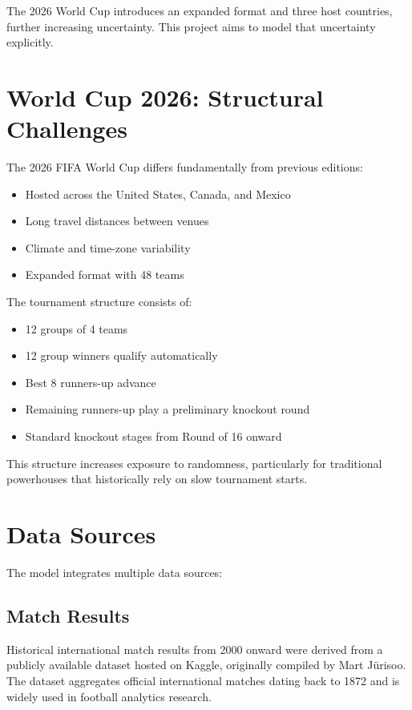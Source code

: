\documentclass[11pt,a4paper]{article}
\begin{document}
The 2026 World Cup introduces an expanded format and three host countries, further increasing uncertainty. This project aims to model that uncertainty explicitly.

\section{World Cup 2026: Structural Challenges}

The 2026 FIFA World Cup differs fundamentally from previous editions:
\begin{itemize}
    \item Hosted across the United States, Canada, and Mexico
    \item Long travel distances between venues
    \item Climate and time-zone variability
    \item Expanded format with 48 teams
\end{itemize}

The tournament structure consists of:
\begin{itemize}
    \item 12 groups of 4 teams
    \item 12 group winners qualify automatically
    \item Best 8 runners-up advance
    \item Remaining runners-up play a preliminary knockout round
    \item Standard knockout stages from Round of 16 onward
\end{itemize}

This structure increases exposure to randomness, particularly for traditional powerhouses that historically rely on slow tournament starts.

\clearpage

\section{Data Sources}

The model integrates multiple data sources:

\subsection{Match Results}

Historical international match results from 2000 onward were derived from a publicly available dataset hosted on Kaggle, originally compiled by Mart Jürisoo. The dataset aggregates official international matches dating back to 1872 and is widely used in football analytics research.
\end{document}

